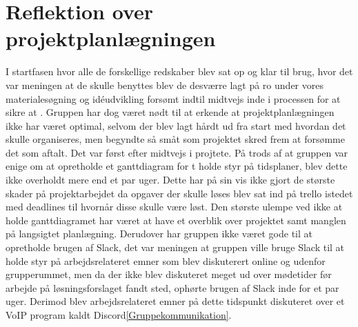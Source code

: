 \section{Reflektion over projektplanlægningen}\label{Reflektion-over-projektplanlaegningen}
I startfasen hvor alle de forskellige redskaber blev sat op og klar til brug, hvor det var meningen at de skulle benyttes blev de desværre lagt på ro under vores materialesøgning og idéudvikling forsømt indtil midtvejs inde i processen for at sikre at  . Gruppen har dog været nødt til at erkende at projektplanlægningen ikke har været optimal, selvom der blev lagt hårdt ud fra start med hvordan det skulle organiseres, men begyndte så småt som projektet skred frem at forsømme det som aftalt. Det var først efter midtvejs i projtete. På trods af at gruppen var enige om at opretholde et ganttdiagram for t holde styr på tidsplaner, blev dette ikke overholdt mere end et par uger. Dette har på sin vis ikke gjort de største skader på projektarbejdet da opgaver der skulle løses blev sat ind på trello istedet med deadlines til hvornår disse skulle være løst. Den største ulempe ved ikke at holde ganttdiagramet har været at have et overblik over projektet samt manglen på langsigtet planlægning. Derudover har gruppen ikke været gode til at opretholde brugen af Slack, det var meningen at gruppen ville bruge Slack til at holde styr på arbejdsrelateret emner som blev diskuterert online og udenfor grupperummet, men da der ikke blev diskuteret meget ud over mødetider før arbejde på løsningsforslaget fandt sted, ophørte brugen af Slack inde for et par uger. Derimod blev arbejdsrelateret emner på dette tidspunkt diskuteret over et VoIP program kaldt Discord\ref{Gruppekommunikation}.